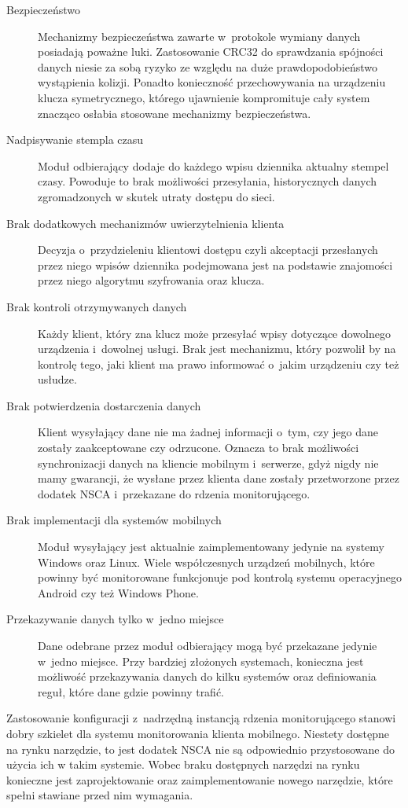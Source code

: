 \begin{description}
\item[Bezpieczeństwo] Mechanizmy bezpieczeństwa zawarte w~protokole
  wymiany danych posiadają poważne luki. Zastosowanie CRC32 do
  sprawdzania spójności danych niesie za sobą ryzyko ze względu na
  duże prawdopodobieństwo wystąpienia kolizji. Ponadto konieczność
  przechowywania na urządzeniu klucza symetrycznego, którego
  ujawnienie kompromituje cały system znacząco osłabia stosowane
  mechanizmy bezpieczeństwa.
\item[Nadpisywanie stempla czasu] Moduł odbierający dodaje do każdego
  wpisu dziennika aktualny stempel czasy. Powoduje to brak możliwości
  przesyłania, historycznych danych zgromadzonych w skutek utraty
  dostępu do sieci.
\item[Brak dodatkowych mechanizmów uwierzytelnienia klienta] Decyzja
  o~przydzieleniu klientowi dostępu czyli akceptacji przesłanych przez
  niego wpisów dziennika podejmowana jest na podstawie znajomości
  przez niego algorytmu szyfrowania oraz klucza.
\item[Brak kontroli otrzymywanych danych] Każdy klient, który zna
  klucz może przesyłać wpisy dotyczące dowolnego urządzenia i~dowolnej
  usługi. Brak jest mechanizmu, który pozwolił by na kontrolę tego,
  jaki klient ma prawo informować o~jakim urządzeniu czy też usłudze.
\item[Brak potwierdzenia dostarczenia danych] Klient wysyłający dane
  nie ma żadnej informacji o~tym, czy jego dane zostały zaakceptowane
  czy odrzucone. Oznacza to brak możliwości synchronizacji danych na
  kliencie mobilnym i~serwerze, gdyż nigdy nie mamy gwarancji, że
  wysłane przez klienta dane zostały przetworzone przez dodatek NSCA
  i~przekazane do rdzenia monitorującego.
\item[Brak implementacji dla systemów mobilnych] Moduł wysyłający jest
  aktualnie zaimplementowany jedynie na systemy Windows oraz
  Linux. Wiele współczesnych urządzeń mobilnych, które powinny być
  monitorowane funkcjonuje pod kontrolą systemu operacyjnego Android
  czy też Windows Phone.
\item[Przekazywanie danych tylko w~jedno miejsce] Dane odebrane przez
  moduł odbierający mogą być przekazane jedynie w~jedno miejsce. Przy
  bardziej złożonych systemach, konieczna jest możliwość przekazywania
  danych do kilku systemów oraz definiowania reguł, które dane gdzie
  powinny trafić.
\end{description}

Zastosowanie konfiguracji z~nadrzędną instancją rdzenia monitorującego
stanowi dobry szkielet dla systemu monitorowania klienta
mobilnego. Niestety dostępne na rynku narzędzie, to jest dodatek NSCA
nie są odpowiednio przystosowane do użycia ich w takim systemie. Wobec
braku dostępnych narzędzi na rynku konieczne jest zaprojektowanie oraz
zaimplementowanie nowego narzędzie, które spełni stawiane przed nim
wymagania.

